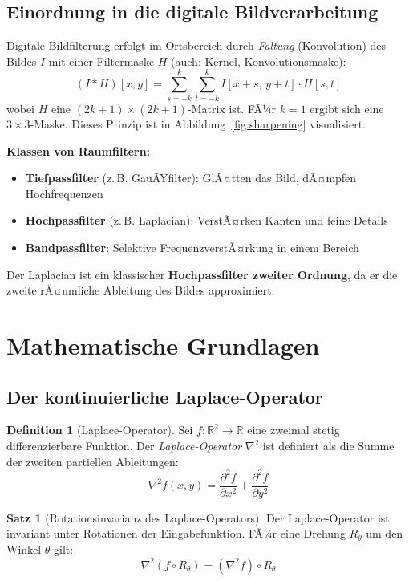 ﻿\documentclass[a4paper,12pt]{article}
\theoremstyle{definition}
\newtheorem{definition}{Definition}
\newtheorem{satz}{Satz}
\begin{document}
\subsection{Einordnung in die digitale Bildverarbeitung}

Digitale Bildfilterung erfolgt im Ortsbereich durch \emph{Faltung} (Konvolution) des Bildes $I$
mit einer Filtermaske $H$ (auch: Kernel, Konvolutionsmaske):
\[
    (I * H)[x,y] = \sum_{s=-k}^{k} \sum_{t=-k}^{k} I[x+s,\, y+t] \cdot H[s,t]
\]
wobei $H$ eine $(2k{+}1) \times (2k{+}1)$-Matrix ist. FÃ¼r $k=1$ ergibt sich eine $3\times3$-Maske.
Dieses Prinzip ist in Abbildung~\ref{fig:sharpening} visualisiert.

\textbf{Klassen von Raumfiltern:}
\begin{itemize}
    \item \textbf{Tiefpassfilter} (z.\,B. GauÃŸfilter): GlÃ¤tten das Bild, dÃ¤mpfen Hochfrequenzen
    \item \textbf{Hochpassfilter} (z.\,B. Laplacian): VerstÃ¤rken Kanten und feine Details
    \item \textbf{Bandpassfilter}: Selektive FrequenzverstÃ¤rkung in einem Bereich
\end{itemize}
Der Laplacian ist ein klassischer \textbf{Hochpassfilter zweiter Ordnung}, da er die zweite
rÃ¤umliche Ableitung des Bildes approximiert.

\section{Mathematische Grundlagen}

\subsection{Der kontinuierliche Laplace-Operator}

\begin{definition}[Laplace-Operator]
    Sei $f: \mathbb{R}^2 \to \mathbb{R}$ eine zweimal stetig differenzierbare Funktion.
    Der \emph{Laplace-Operator} $\nabla^2$ ist definiert als die Summe der zweiten partiellen
    Ableitungen:
    \[
        \nabla^2 f(x,y) = \frac{\partial^2 f}{\partial x^2} + \frac{\partial^2 f}{\partial y^2}
    \]
\end{definition}

\begin{satz}[Rotationsinvarianz des Laplace-Operators]
\label{satz:rotinv}
    Der Laplace-Operator ist invariant unter Rotationen der Eingabefunktion. FÃ¼r eine Drehung
    $R_\theta$ um den Winkel $\theta$ gilt:
    \[
        \nabla^2 (f \circ R_\theta) = (\nabla^2 f) \circ R_\theta
    \]
\end{satz}
\end{document}
